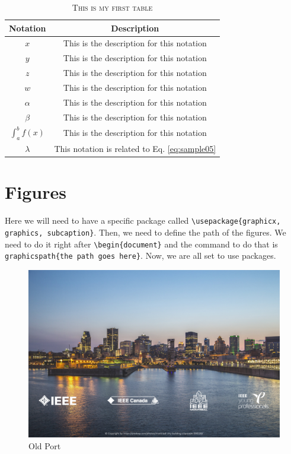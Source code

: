 \documentclass{article}
\begin{document}
\begin{table}[hb]
	\centering
	\label{tab:mysecondtab}
	\begin{tabular}{ c || c }
		\textbf{Notation} & \textbf{Description} \\ \hline \hline
		$x$ & This is the description for this notation \\ \hline
		$y$ & This is the description for this notation \\ \hline
		$z$ & This is the description for this notation \\ \hline
		$w$ & This is the description for this notation \\ \hline
		$\alpha$ & This is the description for this notation \\ \hline
		$\beta$ & This is the description for this notation \\ \hline
		$\int_{a}^{b} f(x)$  & This is the description for this notation \\ \hline
		$\lambda$ & This notation is related to Eq. \ref{eq:sample05} \\ \hline
	\end{tabular}
	\caption{\textsc{This is my first table}}	
\end{table}



\section{Figures}
\label{sec:figures}

Here we will need to have a specific package called \verb|\usepackage{graphicx, graphics, subcaption}|. Then, we need to define the path of the figures. We need to do it right after \verb|\begin{document}| and the command to do that is \verb|graphicspath{the path goes here}|. Now, we are all set to use packages. 


\begin{figure}
	\centering
	\includegraphics[width=.5\linewidth]{OldPort.jpg}
	\caption{Old Port}
	\label{fig:oldport}
\end{figure}
\end{document}
